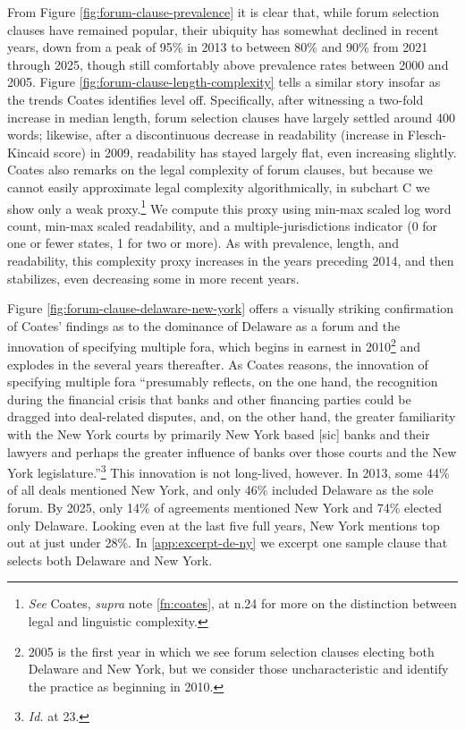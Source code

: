 \documentclass[12pt]{article}
\begin{document}
{From Figure \ref{fig:forum-clause-prevalence} it is clear that, while forum selection clauses have remained popular, their ubiquity has somewhat declined in recent years, down from a peak of 95\% in 2013 to between 80\% and 90\% from 2021 through 2025, though still comfortably above prevalence rates between 2000 and 2005. Figure \ref{fig:forum-clause-length-complexity} tells a similar story insofar as the trends Coates identifies level off. Specifically, after witnessing a two-fold increase in median length, forum selection clauses have largely settled around 400 words; likewise, after a discontinuous decrease in readability (increase in Flesch-Kincaid score) in 2009, readability has stayed largely flat, even increasing slightly. Coates also remarks on the legal complexity of forum clauses, but because we cannot easily approximate legal complexity algorithmically, in subchart C we show only a weak proxy.\footnote{\emph{See} Coates, \emph{supra} note \ref{fn:coates}, at n.24 for more on the distinction between legal and linguistic complexity.} We compute this proxy using min-max scaled log word count, min-max scaled readability, and a multiple-jurisdictions indicator (0 for one or fewer states, 1 for two or more). As with prevalence, length, and readability, this complexity proxy increases in the years preceding 2014, and then stabilizes, even decreasing some in more recent years.

Figure \ref{fig:forum-clause-delaware-new-york} offers a visually striking confirmation of Coates' findings as to the dominance of Delaware as a forum and the innovation of specifying multiple fora, which begins in earnest in 2010\footnote{2005 is the first year in which we see forum selection clauses electing both Delaware and New York, but we consider those uncharacteristic and identify the practice as beginning in 2010.} and explodes in the several years thereafter. As Coates reasons, the innovation of specifying multiple fora ``presumably reflects, on the one hand, the recognition during the financial crisis that banks and other financing parties could be dragged into deal-related disputes, and, on the other hand, the greater familiarity with the New York courts by primarily New York based [sic] banks and their lawyers and perhaps the greater influence of banks over those courts and the New York legislature.''\footnote{\emph{Id.} at 23.} This innovation is not long-lived, however. In 2013, some 44\% of all deals mentioned New York, and only 46\% included Delaware as the sole forum. By 2025, only 14\% of agreements mentioned New York and 74\% elected only Delaware. Looking even at the last five full years, New York mentions top out at just under 28\%. In \autoref{app:excerpt-de-ny} we excerpt one sample clause that selects both Delaware and New York.

}
\end{document}
